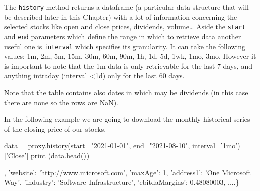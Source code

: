 The \texttt{history} method returns a dataframe (a particular data structure that will be described later in this Chapter) with a lot of information concerning the selected stocks like open and close prices, dividends, volume\ldots
Aside the \texttt{start} and \texttt{end} parameters which define the range in which to retrieve data another useful one is \texttt{interval} which specifies its granularity. It can take the following values: 1m, 2m, 5m, 15m, 30m, 60m, 90m, 1h, 1d, 5d, 1wk, 1mo, 3mo. However it is important to note that the 1m data is only retrievable for the last 7 days, and anything intraday (interval <1d) only for the last 60 days.

Note that the table contains also dates in which may be dividends (in this case there are none so the rows are NaN).
  
In the following example we are going to download the monthly historical series of the closing price of our stocks.

\begin{ipython}
data = proxy.history(start="2021-01-01", end="2021-08-10", interval='1mo')['Close']
print (data.head())
\end{ipython}
, 
'website': 'http://www.microsoft.com', 'maxAge': 1, 'address1': 'One Microsoft Way', 
'industry': 'Software-Infrastructure', 'ebitdaMargins': 0.48080003, ....\}
\end{ioutput}

